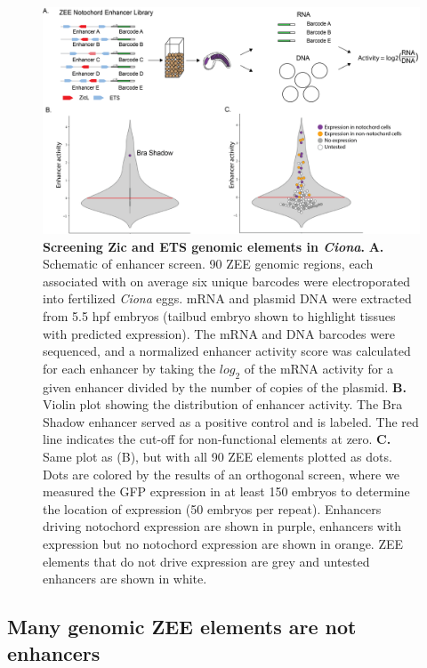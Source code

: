 \begin{figure}[p]
    \centering
    \includegraphics[scale=.5]{2_figures-and-files/Fig2_Enhancer-Screen_Expression-Distribution.png}
    \caption[Screening Zic and ETS genomic elements in \textit{Ciona}]{\textbf{Screening Zic and ETS genomic elements in \textit{Ciona}.} \textbf{A.} Schematic of enhancer screen. 90 ZEE genomic regions, each associated with on average six unique barcodes were electroporated into fertilized \textit{Ciona} eggs. mRNA and plasmid DNA were extracted from 5.5 hpf embryos (tailbud embryo shown to highlight tissues with predicted expression). The mRNA and DNA barcodes were sequenced, and a normalized enhancer activity score was calculated for each enhancer by taking the $log_2$ of the mRNA activity for a given enhancer divided by the number of copies of the plasmid. \textbf{B.} Violin plot showing the distribution of enhancer activity. The Bra Shadow enhancer served as a positive control and is labeled. The red line indicates the cut-off for non-functional elements at zero. \textbf{C.} Same plot as (B), but with all 90 ZEE elements plotted as dots. Dots are colored by the results of an orthogonal screen, where we measured the GFP expression in at least 150 embryos to determine the location of expression (50 embryos per repeat). Enhancers driving notochord expression are shown in purple, enhancers with expression but no notochord expression are shown in orange. ZEE elements that do not drive expression are grey and untested enhancers are shown in white.}
    \label{fig:2 enhancer screen schematic}
\end{figure}

\subsection{Many genomic ZEE elements are not enhancers}


